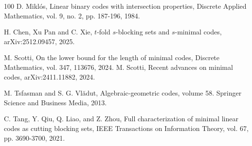 \documentclass[10pt,a4paper]{article}
\begin{document}
\begin{thebibliography}{100}
 D. Mikl\'{o}s, Linear binary codes with intersection properties, Discrete Applied Mathematics,
vol. 9, no. 2, pp. 187-196, 1984.


 H. Chen, Xu Pan and C. Xie, $t$-fold $s$-blocking sets and $s$-minimal codes, arXiv:2512.09457, 2025.




 M. Scotti, On the lower bound for the length of minimal codes, Discrete Mathematics, vol. 347, 113676, 2024.
 M. Scotti, Recent advances on minimal codes, arXiv:2411.11882, 2024.


 M. Tsfasman and S. G. Vl\u{a}dut, Algebraic-geometric codes, volume 58. Springer Science and
Business Media, 2013.


    C. Tang, Y. Qiu, Q. Liao, and Z. Zhou, Full characterization of minimal
linear codes as cutting blocking sets, IEEE Transactions on Information Theory, vol. 67, pp. 3690-3700, 2021.


\end{thebibliography}
\end{document}
